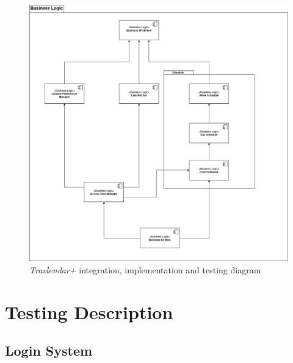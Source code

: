 \begin{figure}[H]
    \centering
    \includegraphics[scale=0.35]{Pictures/ImplementationDiagram/IntegrationDiagram.png}
    \caption{\emph{Travlendar+} integration, implementation and testing diagram}
\end{figure}

\section{Testing Description}

\renewcommand{\arraystretch}{1.9}

\subsection*{Login System}

